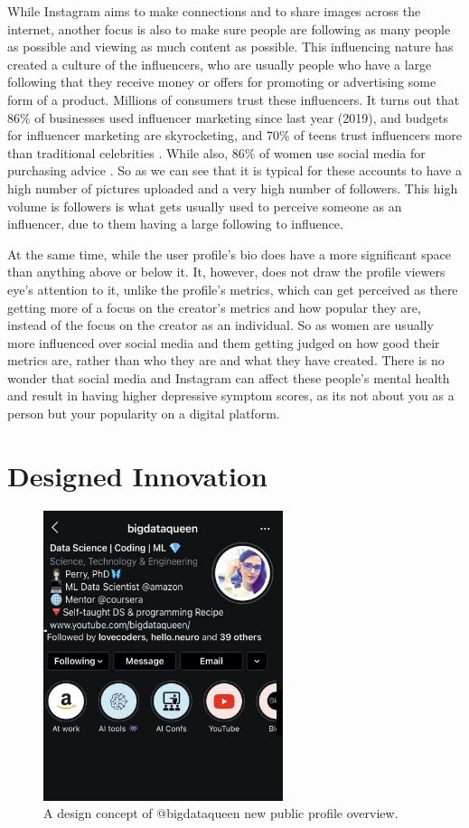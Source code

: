 \documentclass{sigchi}
\begin{document}
	While Instagram aims to make connections and to share images across the internet, another focus is also to make sure people are following as many people as possible and viewing as much content as possible. This influencing nature has created a culture of the influencers, who are usually people who have a large following that they receive money or offers for promoting or advertising some form of a product. Millions of consumers trust these influencers. It turns out that 86\% of businesses used influencer marketing since last year (2019), and budgets for influencer marketing are skyrocketing, and 70\% of teens trust influencers more than traditional celebrities \cite{influencers}.  While also, 86\% of women use social media for purchasing advice \cite{influencers}. So as we can see that it is typical for these accounts to have a high number of pictures uploaded and a very high number of followers. This high volume is followers is what gets usually used to perceive someone as an influencer, due to them having a large following to influence.
	
	At the same time, while the user profile's bio does have a more significant space than anything above or below it. It, however, does not draw the profile viewers eye's attention to it, unlike the profile's metrics, which can get perceived as there getting more of a focus on the creator's metrics and how popular they are, instead of the focus on the creator as an individual. So as women are usually more influenced over social media and them getting judged on how good their metrics are, rather than who they are and what they have created. There is no wonder that social media and Instagram can affect these people's mental health and result in having higher depressive symptom scores, as its not about you as a person but your popularity on a digital platform.

\section{Designed Innovation}

\begin{figure}
	\begin{center}
		\includegraphics[width=7cm]{instagram_example2.jpg}
		\caption{A design concept of @bigdataqueen new public profile overview.}
		\label{fig:instagram_new_overview}
	\end{center}
\end{figure}
\end{document}
